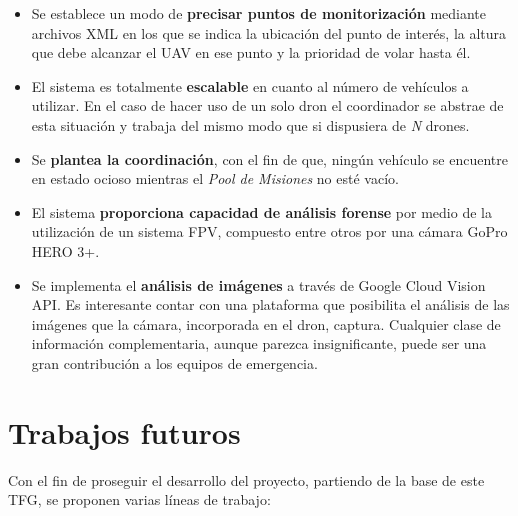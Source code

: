 \begin{itemize}
\item Se establece un modo de \textbf{precisar puntos de monitorización} mediante archivos XML en los que se indica la ubicación del punto de interés, la altura que debe alcanzar el \acs{UAV} en ese punto y la prioridad de volar hasta él.
\item El sistema es totalmente \textbf{escalable} en cuanto al número de vehículos a utilizar. En el caso de hacer uso de un solo dron el coordinador se abstrae de esta situación y trabaja del mismo modo que si dispusiera de \textit{N} drones.
\item Se \textbf{plantea la coordinación}, con el fin de que, ningún vehículo se encuentre en estado ocioso mientras el \textit{Pool de Misiones} no esté vacío.
\item El sistema \textbf{proporciona capacidad de análisis forense} por medio de la utilización de un sistema \acs{FPV}, compuesto entre otros por una cámara GoPro HERO 3+.
\item Se implementa el \textbf{análisis de imágenes} a través de Google Cloud Vision \acs{API}. Es interesante contar con una plataforma que posibilita el análisis de las imágenes que la cámara, incorporada en el dron, captura. Cualquier clase de información complementaria, aunque parezca insignificante, puede ser una gran contribución a los equipos de emergencia.
\end{itemize}

\section{Trabajos futuros}
\label{sec:trabajos futuros}

Con el fin de proseguir el desarrollo del proyecto, partiendo de la base de este \acs{TFG}, se proponen varias líneas de trabajo:

